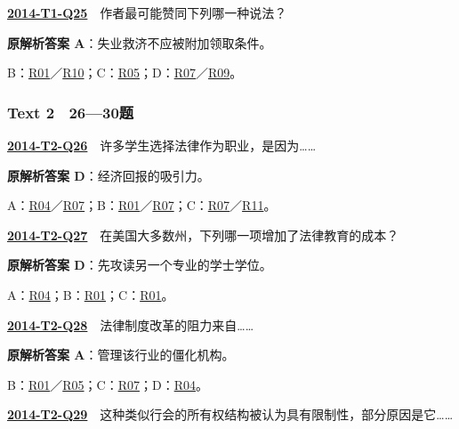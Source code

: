 \documentclass[11pt,a4paper]{article}
\begin{document}
\label{idx-2014-T1-Q25}\noindent\textbf{\href{https://zj139.github.io/math-notes/english/3becb5a63150d4e967a5c91f/\#q25}{2014-T1-Q25}}　作者最可能赞同下列哪一种说法？\par\nopagebreak
\noindent\textbf{原解析答案 A}：失业救济不应被附加领取条件。\par\nopagebreak
\noindent B：\hyperref[cat-R01]{R01}／\hyperref[cat-R10]{R10}；C：\hyperref[cat-R05]{R05}；D：\hyperref[cat-R07]{R07}／\hyperref[cat-R09]{R09}。\par\smallskip
{}\subsubsection{Text 2　26—30题}
\label{idx-2014-T2-Q26}\noindent\textbf{\href{https://zj139.github.io/math-notes/english/8f6f7a5e65fac14d43f1506b/\#q26}{2014-T2-Q26}}　许多学生选择法律作为职业，是因为……\par\nopagebreak
\noindent\textbf{原解析答案 D}：经济回报的吸引力。\par\nopagebreak
\noindent A：\hyperref[cat-R04]{R04}／\hyperref[cat-R07]{R07}；B：\hyperref[cat-R01]{R01}／\hyperref[cat-R07]{R07}；C：\hyperref[cat-R07]{R07}／\hyperref[cat-R11]{R11}。\par\smallskip
{}\label{idx-2014-T2-Q27}\noindent\textbf{\href{https://zj139.github.io/math-notes/english/8f6f7a5e65fac14d43f1506b/\#q27}{2014-T2-Q27}}　在美国大多数州，下列哪一项增加了法律教育的成本？\par\nopagebreak
\noindent\textbf{原解析答案 D}：先攻读另一个专业的学士学位。\par\nopagebreak
\noindent A：\hyperref[cat-R04]{R04}；B：\hyperref[cat-R01]{R01}；C：\hyperref[cat-R01]{R01}。\par\smallskip
{}\label{idx-2014-T2-Q28}\noindent\textbf{\href{https://zj139.github.io/math-notes/english/8f6f7a5e65fac14d43f1506b/\#q28}{2014-T2-Q28}}　法律制度改革的阻力来自……\par\nopagebreak
\noindent\textbf{原解析答案 A}：管理该行业的僵化机构。\par\nopagebreak
\noindent B：\hyperref[cat-R01]{R01}／\hyperref[cat-R05]{R05}；C：\hyperref[cat-R07]{R07}；D：\hyperref[cat-R04]{R04}。\par\smallskip
{}\label{idx-2014-T2-Q29}\noindent\textbf{\href{https://zj139.github.io/math-notes/english/8f6f7a5e65fac14d43f1506b/\#q29}{2014-T2-Q29}}　这种类似行会的所有权结构被认为具有限制性，部分原因是它……\par\nopagebreak
\end{document}
